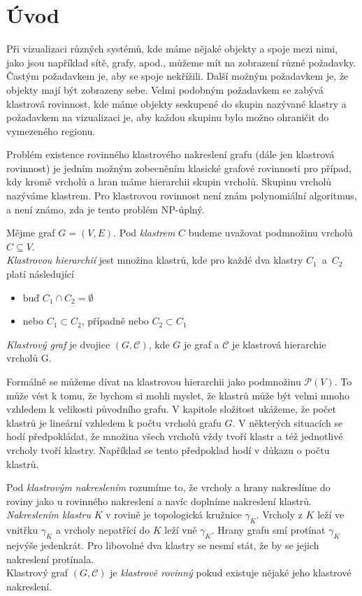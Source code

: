 \chapter{Úvod}

Při vizualizaci různých systémů, kde máme nějaké objekty a spoje mezi nimi, jako jsou například sítě, grafy, apod., můžeme mít na zobrazení různé požadavky. Častým požadavkem je, aby se spoje nekřížili. Další možným požadavkem je, že objekty mají být zobrazeny  sebe. Velmi podobným požadavkem se zabývá klastrová rovinnost, kde máme objekty seskupené do skupin nazývané klastry a požadavkem na vizualizaci je, aby každou skupinu bylo možno ohraničit do vymezeného regionu.

Problém existence rovinného klastrového nakreslení grafu (dále jen klastrová rovinnost) je jedním možným zobecněním klasické grafové rovinnosti pro případ, kdy kromě vrcholů a hran máme hierarchii skupin vrcholů. Skupinu vrcholů nazýváme klastrem. Pro klastrovou rovinnost není znám polynomiální algoritmus, a není známo, zda je tento problém NP-úplný. 

\begin{defn}
Mějme graf $G=(V,E)$. Pod \textit{klastrem} $C$ budeme uvažovat podmnožinu vrcholů  $C \subseteq V$. \\
\textit{Klastrovou hierarchií} jest množina klastrů, kde pro každé dva klastry $C_1$~a~$C_2$ platí následující
\begin{itemize}
\item buď $C_1 \cap C_2 = \emptyset$
\item nebo $C_1 \subset C_2$, případně nebo $C_2 \subset C_1$
\end{itemize}
\textit{Klastrový graf} je dvojice $(G,\mathcal C)$, kde $G$ je graf a $\mathcal C$ je klastrová hierarchie vrcholů G.
\end{defn}

Formálně se můžeme dívat na klastrovou hierarchii jako podmnožinu $\mathcal P (V)$. To může vést k tomu, že bychom si mohli myslet, že klastrů může být velmi mnoho vzhledem k velikosti původního grafu. V kapitole složitost ukážeme, že počet klastrů je lineární vzhledem k počtu vrcholů grafu $G$. V některých situacích se hodí předpokládat, že množina všech vrcholů vždy tvoří klastr a též jednotlivé vrcholy tvoří klastry. Například se tento předpoklad  hodí v důkazu o počtu klastrů.

\begin{defn}
Pod \textit{klastrovým nakreslením} rozumíme to, že vrcholy a hrany nakreslíme do roviny jako u rovinného nakreslení a navíc doplníme nakreslení klastrů.\\ 
\textit{Nakreslením klastru} $K$ v rovině je topologická kružnice $\gamma_K$. Vrcholy z $K$ leží ve vnitřku $\gamma_K$ a vrcholy nepatřící do $K$ leží vně $\gamma_K$. Hrany grafu smí protínat $\gamma_K$ nejvýše jedenkrát. Pro libovolné dva klastry se nesmí stát, že by se jejich nakreslení protínala.\\
Klastrový graf $(G,\mathcal C)$ je \textit{klastrově rovinný} pokud existuje nějaké jeho klastrové nakreslení.
\end{defn}

